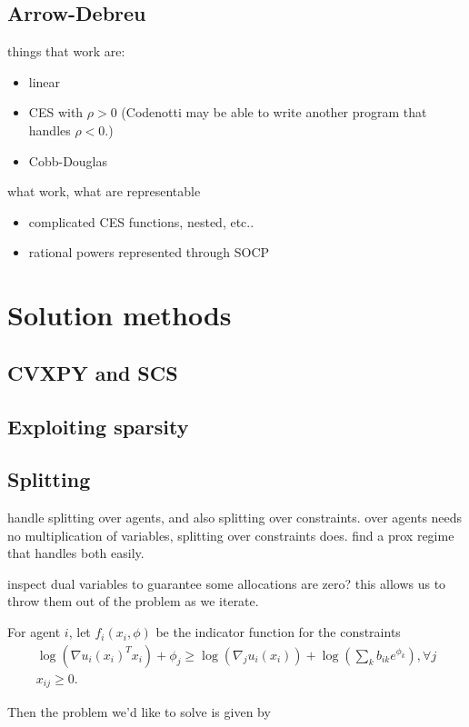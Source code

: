 \documentclass{article}
\begin{document}
\subsection{Arrow-Debreu}
things that work are:
\begin{itemize}
\item linear
\item CES with $\rho > 0$ (Codenotti may be able to write another program that handles $\rho < 0$.)
\item Cobb-Douglas
\end{itemize}
what work, what are representable
\begin{itemize}
\item complicated CES functions, nested, etc..
\item rational powers represented through SOCP
\end{itemize}

\section{Solution methods}

\subsection{CVXPY and SCS}
\subsection{Exploiting sparsity}
\subsection{Splitting}
handle splitting over agents, and also splitting over constraints. over agents needs no multiplication of variables, splitting over constraints does. find a prox regime that handles both easily.

inspect dual variables to guarantee some allocations are zero? this allows us to throw them out of the problem as we iterate.

For agent $i$, let  $f_i(x_i, \phi)$ be the indicator function for the constraints
\[
\begin{array}{c}
\log(\nabla u_i(x_i)^T x_i) + \phi_j \geq  \log(\nabla_j u_i(x_i)) +  \log(\sum_k b_{ik} e^{\phi_k}), \forall j\\
x_{ij} \geq 0.
\end{array}
\]

Then the problem we'd like to solve is given by
\end{document}
